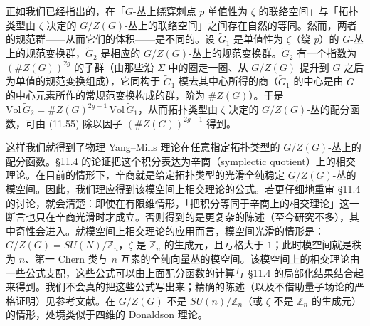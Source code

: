 
正如我们已经指出的，在「$G$-丛上绕穿刺点 $p$ 单值性为 $\zeta$ 的联络空间」与「拓扑类型由 $\zeta$ 决定的 $G/Z(G)$-丛上的联络空间」之间存在自然的等同。然而，两者的规范群——从而它们的体积——是不同的。设 $\widetilde{G}_1$ 是单值性为 $\zeta$（绕 $p$）的 $G$-丛上的规范变换群，$\widetilde{G}_2$ 是相应的 $G/Z(G)$-丛上的规范变换群。$\widetilde{G}_2$ 有一个指数为 $(\#Z(G))^{2g}$ 的子群（由那些沿 $\Sigma$ 中的圈走一圈、从 $G/Z(G)$ 提升到 $G$ 之后为单值的规范变换组成），它同构于 $\widetilde{G}_1$ 模去其中心所得的商（$\widetilde{G}_1$ 的中心是由 $G$ 的中心元素所作的常规范变换构成的群，阶为 $\#Z(G)$）。于是 $\mathrm{Vol}\,\widetilde{G}_2=\#Z(G)^{2g-1}\,\mathrm{Vol}\,\widetilde{G}_1$，从而拓扑类型由 $\zeta$ 决定的 $G/Z(G)$-丛的配分函数，可由 (11.55) 除以因子 $(\#Z(G))^{2g-1}$ 得到。


这样我们就得到了物理 Yang--Mills 理论在任意指定拓扑类型的 $G/Z(G)$-丛上的配分函数。§11.4 的论证把这个积分表达为辛商（symplectic quotient）上的相交理论。在目前的情形下，辛商就是给定拓扑类型的光滑全纯稳定 $G/Z(G)$-丛的模空间。因此，我们理应得到该模空间上相交理论的公式。若更仔细地重审 §11.4 的讨论，就会清楚：即使在有限维情形，「把积分等同于辛商上的相交理论」这一断言也只在辛商光滑时才成立。否则得到的是更复杂的陈述（至今研究不多），其中奇性会进入。就模空间上相交理论的应用而言，模空间光滑的情形是：$G/Z(G)=SU(N)/\mathbb{Z}_n$，$\zeta$ 是 $\mathbb{Z}_n$ 的生成元，且亏格大于 $1$；此时模空间就是秩为 $n$、第一 Chern 类与 $n$ 互素的全纯向量丛的模空间。该模空间上的相交理论由一些公式支配，这些公式可以由上面配分函数的计算与 §11.4 的局部化结果结合起来得到。我们不会真的把这些公式写出来；精确的陈述（以及不借助量子场论的严格证明）见参考文献。在 $G/Z(G)$ 不是 $SU(n)/\mathbb{Z}_n$（或 $\zeta$ 不是 $\mathbb{Z}_n$ 的生成元）的情形，处境类似于四维的 Donaldson 理论。

